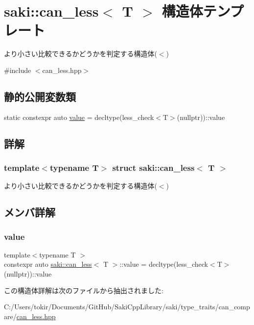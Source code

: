\hypertarget{structsaki_1_1can__less}{}\section{saki\+:\+:can\+\_\+less$<$ T $>$ 構造体テンプレート}
\label{structsaki_1_1can__less}


より小さい比較できるかどうかを判定する構造体($<$)  




{\ttfamily \#include $<$can\+\_\+less.\+hpp$>$}

\subsection*{静的公開変数類}
\begin{DoxyCompactItemize}
\item 
static constexpr auto \mbox{\hyperlink{structsaki_1_1can__less_a49490d61ea0770eaf912571ff7219b29}{value}} = decltype(less\+\_\+check$<$T$>$(nullptr))\+::value
\end{DoxyCompactItemize}


\subsection{詳解}
\subsubsection*{template$<$typename T$>$\newline
struct saki\+::can\+\_\+less$<$ T $>$}

より小さい比較できるかどうかを判定する構造体($<$) 

\subsection{メンバ詳解}
\mbox{\label{structsaki_1_1can__less_a49490d61ea0770eaf912571ff7219b29}} 
\subsubsection{\texorpdfstring{value}{value}}
{\footnotesize\ttfamily template$<$typename T $>$ \\
constexpr auto \mbox{\hyperlink{structsaki_1_1can__less}{saki\+::can\+\_\+less}}$<$ T $>$\+::value = decltype(less\+\_\+check$<$T$>$(nullptr))\+::value\hspace{0.3cm}{\ttfamily [static]}}



この構造体詳解は次のファイルから抽出されました\+:\begin{DoxyCompactItemize}
\item 
C\+:/\+Users/tokir/\+Documents/\+Git\+Hub/\+Saki\+Cpp\+Library/saki/type\+\_\+traits/can\+\_\+compare/\mbox{\hyperlink{can__less_8hpp}{can\+\_\+less.\+hpp}}\end{DoxyCompactItemize}
